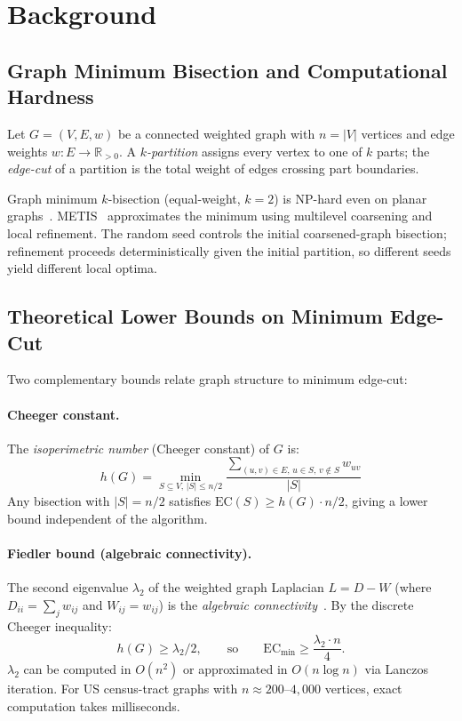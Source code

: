 \section{Background}
\label{sec:background}

\subsection{Graph Minimum Bisection and Computational Hardness}

Let $G = (V, E, w)$ be a connected weighted graph with $n = |V|$ vertices and
edge weights $w : E \to \mathbb{R}_{>0}$. A \emph{$k$-partition} assigns every
vertex to one of $k$ parts; the \emph{edge-cut} of a partition is the total
weight of edges crossing part boundaries.

Graph minimum $k$-bisection (equal-weight, $k=2$) is NP-hard even on planar
graphs~\citep{garey1979computers}. METIS~\citep{karypis1998fast} approximates
the minimum using multilevel coarsening and local refinement. The random seed
controls the initial coarsened-graph bisection; refinement proceeds
deterministically given the initial partition, so different seeds yield
different local optima.

\subsection{Theoretical Lower Bounds on Minimum Edge-Cut}
\label{sec:background:bounds}

Two complementary bounds relate graph structure to minimum edge-cut:

\paragraph{Cheeger constant.}
The \emph{isoperimetric number} (Cheeger constant) of $G$ is:
\[
  h(G) = \min_{S \subseteq V,\, |S| \leq n/2}
           \frac{\sum_{(u,v)\in E,\, u\in S,\, v\notin S} w_{uv}}{|S|}
\]
Any bisection with $|S| = n/2$ satisfies
$\mathrm{EC}(S) \geq h(G) \cdot n/2$, giving a lower bound independent of the
algorithm.

\paragraph{Fiedler bound (algebraic connectivity).}
The second eigenvalue $\lambda_2$ of the weighted graph Laplacian $L = D - W$
(where $D_{ii} = \sum_j w_{ij}$ and $W_{ij} = w_{ij}$) is the \emph{algebraic
connectivity}~\citep{fiedler1973algebraic}. By the discrete Cheeger inequality:
\[
  h(G) \geq \lambda_2 / 2,
  \qquad\text{so}\qquad
  \mathrm{EC}_{\min} \geq \frac{\lambda_2 \cdot n}{4}.
\]
$\lambda_2$ can be computed in $O(n^2)$ or approximated in $O(n \log n)$ via
Lanczos iteration. For US census-tract graphs with $n \approx 200$--$4{,}000$
vertices, exact computation takes milliseconds.

